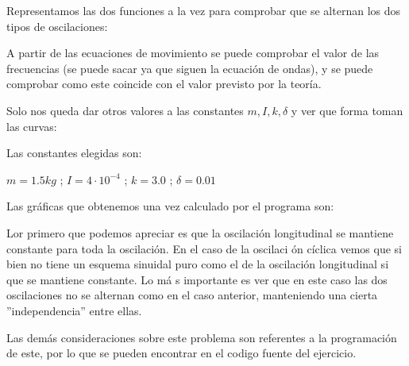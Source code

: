 \documentclass[12pt,thmsa]{article}
\begin{document}
Representamos las dos funciones a la vez para comprobar que se alternan los
dos tipos de oscilaciones:


\vspace{1pt}

A partir de las ecuaciones de movimiento se puede comprobar el valor de las
frecuencias (se puede sacar ya que siguen la ecuaci\'{o}n de ondas), y se
puede comprobar como este coincide con el valor previsto por la teor\'{i}a.

\vspace{1pt}

Solo nos queda dar otros valores a las constantes $m,I,k,\delta $ y ver que
forma toman las curvas:

Las constantes elegidas son:

$m=1.5kg$ ; $I=4\cdot 10^{-4}$ ; $k=3.0$ ; $\delta =0.01$

Las gr\'{a}ficas que obtenemos una vez calculado por el programa son:


Lor primero que podemos apreciar es que la oscilaci\'{o}n longitudinal se
mantiene constante para toda la oscilaci\'{o}n. En el caso de la oscilaci%
\'{o}n c\'{i}clica vemos que si bien no tiene un esquema sinuidal puro como
el de la oscilaci\'{o}n longitudinal si que se mantiene constante. Lo m\'{a}%
s importante es ver que en este caso las dos oscilaciones no se alternan
como en el caso anterior, manteniendo una cierta ''independencia'' entre
ellas.

\vspace{1pt}

Las dem\'{a}s consideraciones sobre este problema son referentes a la
programaci\'{o}n de este, por lo que se pueden encontrar en el codigo fuente
del ejercicio.

\vspace{1pt}
\end{document}
